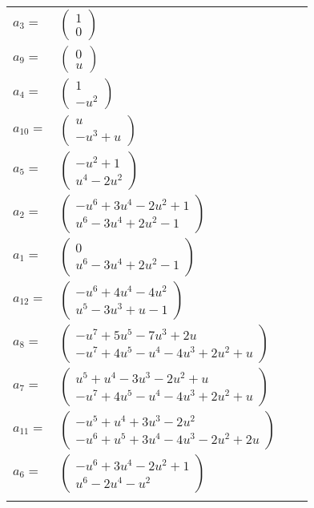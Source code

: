 \documentclass[1p]{elsarticle_modified}
\theoremstyle{definition}
\begin{document}
\begin{tabular}{m{7pt} m{180pt} m{7pt} m{180pt} }
\flushright $a_{3}=$&$\begin{pmatrix}1\\0\end{pmatrix}$ \\
\flushright $a_{9}=$&$\begin{pmatrix}0\\u\end{pmatrix}$ \\
\flushright $a_{4}=$&$\begin{pmatrix}1\\- u^2\end{pmatrix}$ \\
\flushright $a_{10}=$&$\begin{pmatrix}u\\- u^3+u\end{pmatrix}$ \\
\flushright $a_{5}=$&$\begin{pmatrix}- u^2+1\\u^4-2 u^2\end{pmatrix}$ \\
\flushright $a_{2}=$&$\begin{pmatrix}- u^6+3 u^4-2 u^2+1\\u^6-3 u^4+2 u^2-1\end{pmatrix}$ \\
\flushright $a_{1}=$&$\begin{pmatrix}0\\u^6-3 u^4+2 u^2-1\end{pmatrix}$ \\
\flushright $a_{12}=$&$\begin{pmatrix}- u^6+4 u^4-4 u^2\\u^5-3 u^3+u-1\end{pmatrix}$ \\
\flushright $a_{8}=$&$\begin{pmatrix}- u^7+5 u^5-7 u^3+2 u\\- u^7+4 u^5- u^4-4 u^3+2 u^2+u\end{pmatrix}$ \\
\flushright $a_{7}=$&$\begin{pmatrix}u^5+u^4-3 u^3-2 u^2+u\\- u^7+4 u^5- u^4-4 u^3+2 u^2+u\end{pmatrix}$ \\
\flushright $a_{11}=$&$\begin{pmatrix}- u^5+u^4+3 u^3-2 u^2\\- u^6+u^5+3 u^4-4 u^3-2 u^2+2 u\end{pmatrix}$ \\
\flushright $a_{6}=$&$\begin{pmatrix}- u^6+3 u^4-2 u^2+1\\u^6-2 u^4- u^2\end{pmatrix}$\\&\end{tabular}
\end{document}

